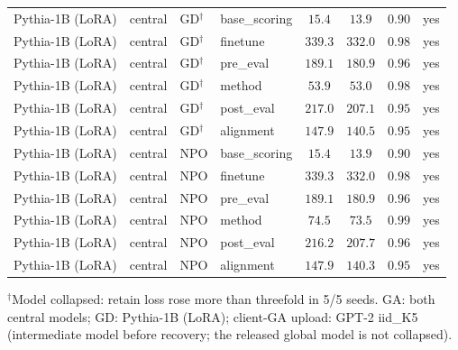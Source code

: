 {\begin{longtable}{@{\extracolsep{\fill}}llllcccc@{}}
Pythia-1B (LoRA) & central & GD$^{\dagger}$ & base\_scoring & $15.4$ & $13.9$ & $0.90$ & yes \\
Pythia-1B (LoRA) & central & GD$^{\dagger}$ & finetune & $339.3$ & $332.0$ & $0.98$ & yes \\
Pythia-1B (LoRA) & central & GD$^{\dagger}$ & pre\_eval & $189.1$ & $180.9$ & $0.96$ & yes \\
Pythia-1B (LoRA) & central & GD$^{\dagger}$ & method & $53.9$ & $53.0$ & $0.98$ & yes \\
Pythia-1B (LoRA) & central & GD$^{\dagger}$ & post\_eval & $217.0$ & $207.1$ & $0.95$ & yes \\
Pythia-1B (LoRA) & central & GD$^{\dagger}$ & alignment & $147.9$ & $140.5$ & $0.95$ & yes \\
Pythia-1B (LoRA) & central & NPO & base\_scoring & $15.4$ & $13.9$ & $0.90$ & yes \\
Pythia-1B (LoRA) & central & NPO & finetune & $339.3$ & $332.0$ & $0.98$ & yes \\
Pythia-1B (LoRA) & central & NPO & pre\_eval & $189.1$ & $180.9$ & $0.96$ & yes \\
Pythia-1B (LoRA) & central & NPO & method & $74.5$ & $73.5$ & $0.99$ & yes \\
Pythia-1B (LoRA) & central & NPO & post\_eval & $216.2$ & $207.7$ & $0.96$ & yes \\
Pythia-1B (LoRA) & central & NPO & alignment & $147.9$ & $140.3$ & $0.95$ & yes \\
\end{longtable}
$^{\dagger}$Model collapsed: retain loss rose more than threefold in 5/5 seeds. GA: both central models; GD: Pythia-1B (LoRA); client-GA upload: GPT-2 iid\_K5 (intermediate model before recovery; the released global model is not collapsed).\par
}
